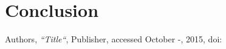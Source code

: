 \section{Conclusion}







\begin{thebibliography}{4}
Authors,
\textit{``Title``},
Publisher,
accessed October -, 2015, doi: 
 
\end{thebibliography}

\newpage
\appendix





